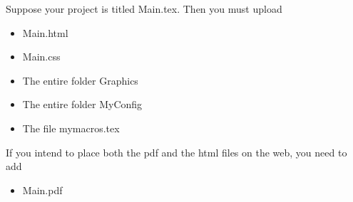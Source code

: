\documentclass[11pt, oneside]{article}   	%
\begin{document}
Suppose your project
is titled Main.tex. Then you must upload
\begin{itemize}
\item Main.html
\item Main.css
\item The entire folder Graphics
\item The entire folder MyConfig
\item The file mymacros.tex
\end{itemize}
If you intend to place both the pdf and the html files on the web, you need to add
\begin{itemize}
\item Main.pdf
\end{itemize}
 
\end{document}
